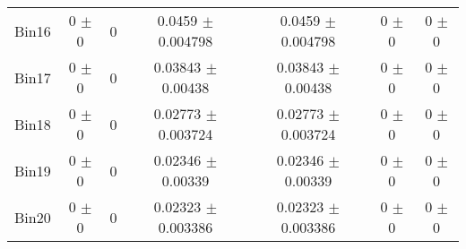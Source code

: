 \begin{tabular}{@{\extracolsep{4pt}}lcccccc@{}}
     Bin16 & 0 $\pm$ 0 & 0 & 0.0459 $\pm$ 0.004798 & 0.0459 $\pm$ 0.004798 & 0 $\pm$ 0 & 0 $\pm$ 0 \\ 
     Bin17 & 0 $\pm$ 0 & 0 & 0.03843 $\pm$ 0.00438 & 0.03843 $\pm$ 0.00438 & 0 $\pm$ 0 & 0 $\pm$ 0 \\ 
     Bin18 & 0 $\pm$ 0 & 0 & 0.02773 $\pm$ 0.003724 & 0.02773 $\pm$ 0.003724 & 0 $\pm$ 0 & 0 $\pm$ 0 \\ 
     Bin19 & 0 $\pm$ 0 & 0 & 0.02346 $\pm$ 0.00339 & 0.02346 $\pm$ 0.00339 & 0 $\pm$ 0 & 0 $\pm$ 0 \\ 
     Bin20 & 0 $\pm$ 0 & 0 & 0.02323 $\pm$ 0.003386 & 0.02323 $\pm$ 0.003386 & 0 $\pm$ 0 & 0 $\pm$ 0 \\ 
\hline\hline
  \end{tabular}
